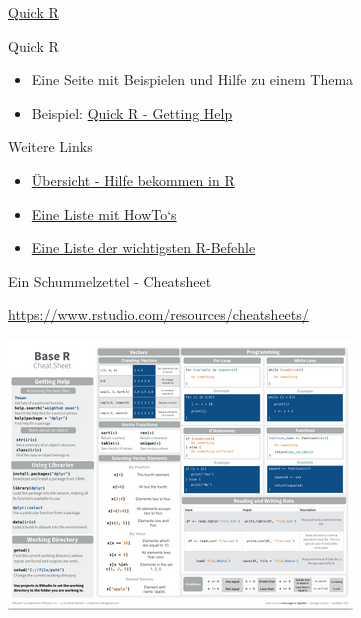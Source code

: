 \documentclass[ignorenonframetext,]{beamer}
\providecommand{\tightlist}{%
\setlength{\itemsep}{0pt}\setlength{\parskip}{0pt}}
\begin{document}
\begin{frame}{\href{http://www.statmethods.net/interface/help.html}{Quick
R}}

\begin{block}{Quick R}

\begin{itemize}
\tightlist
\item
  Eine Seite mit Beispielen und Hilfe zu einem Thema
\item
  Beispiel: \href{http://www.statmethods.net/interface/help.html}{Quick
  R - Getting Help}
\end{itemize}

\end{block}

\begin{block}{Weitere Links}

\begin{itemize}
\item
  \href{https://www.r-project.org/help.html}{Übersicht - Hilfe bekommen
  in R}
\item
  \href{http://rprogramming.net/}{Eine Liste mit HowTo`s}
\item
  \href{https://www.personality-project.org/r/r.commands.html}{Eine
  Liste der wichtigsten R-Befehle}
\end{itemize}

\end{block}

\end{frame}

\begin{frame}{Ein Schummelzettel - Cheatsheet}

\url{https://www.rstudio.com/resources/cheatsheets/}

\includegraphics{./tex2pdf.956/7d1907fc7cfa03bf0f3e2ee3123fcb07ca60f41c.png}

\end{frame}
\end{document}
